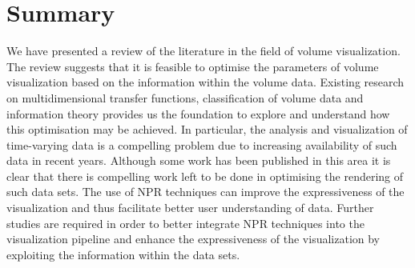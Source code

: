 \section{Summary}
We have presented a review of the literature in the field of volume visualization.
The review suggests that it is feasible to optimise the parameters of volume visualization based on the information within the volume data. Existing research on multidimensional transfer functions, classification of volume data and information theory provides us the foundation to explore and understand how this optimisation may be achieved.
In particular, the analysis and visualization of time-varying data is a compelling problem due to increasing availability of such data in recent years. Although some work has been published in this area it is clear that there is compelling work left to be done in optimising the rendering of such data sets.
The use of NPR techniques can improve the expressiveness of the visualization and thus facilitate better user understanding of data.
Further studies are required in order to better integrate NPR techniques into the visualization pipeline and enhance the expressiveness of the visualization by exploiting the information within the data sets.


